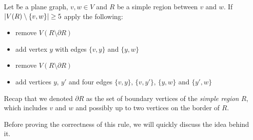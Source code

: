 %
%
%
%

\begin{rgl}\label{rgl:rthree}
    Let \G be a plane graph, $v, w \in V$ and $R$ be a simple region between $v$ and $w$. If $\abs{V(R) \setminus \{v, w\}} \geq 5$ apply the following:

    \begin{caseof}

            \vspace{-5mm}
            \begin{itemize}
                    \item remove $V(R\setminus\partial R)$
                    \item add vertex $y$ with edges $\{v, y\}$ and $\{y, w\}$
            \end{itemize}

            \vspace{-5mm}
            \begin{itemize}
                    \item remove $V(R\setminus\partial R)$
                    \item add vertices $y$, $y'$ and four edges $\{v,y\}$, $\{v, y'\}$, $\{y, w\}$ and $\{y', w\}$
            \end{itemize}
        \end{caseof}
Recap that we denoted $\partial R$ as the set of boundary vertices of the  \textit{simple region} $R$, which includes $v$ and $w$ and possibly up to two vertices on the border of $R$.

\end{rgl}
Before proving the correctness of this rule, we will quickly discuss the idea behind it.

